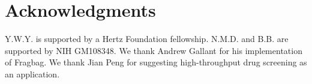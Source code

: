 \documentclass[review,preprint,12pt]{elsarticle}
\theoremstyle{definition}
\theoremstyle{remark}
\numberwithin{equation}{section}
\begin{document}
\section{Acknowledgments}
Y.W.Y. is supported by a Hertz Foundation fellowship.
N.M.D. and B.B. are supported by NIH GM108348.
We thank Andrew Gallant for his implementation of Fragbag.
We thank Jian Peng for suggesting high-throughput drug screening as an application.


%

\end{document}
